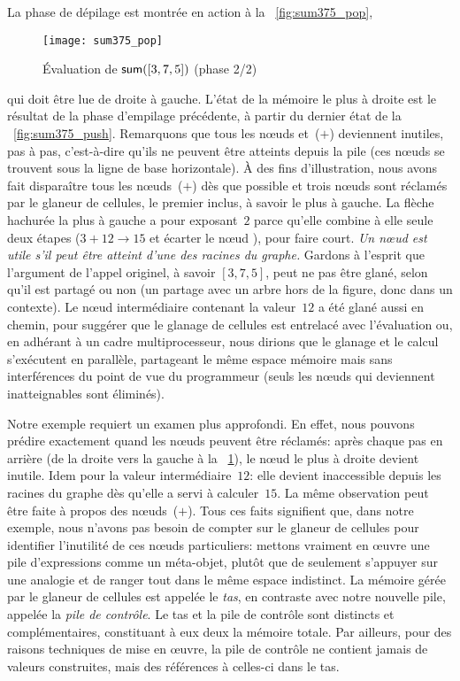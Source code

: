La phase de dépilage est montrée en action à la \fig~\vref{fig:sum375_pop},
\begin{figure}[b]
\centering
\texttt{[image: sum375\_pop]}
\caption{Évaluation de \(\textsf{sum}([3,7,5])\) (phase 2/2)
\label{fig:sum375_pop}}
\end{figure}
qui doit être lue de droite à gauche. L'état de la mémoire le plus à
droite est le résultat de la phase d'empilage précédente, à partir du
dernier état de la \fig~\ref{fig:sum375_push}. Remarquons que tous les
n{\oe}uds  et~(\(+\)) deviennent inutiles, pas à pas,
c'est-à-dire qu'ils ne peuvent être atteints depuis la pile (ces
n{\oe}uds se trouvent sous la ligne de base horizontale). À des fins
d'illustration, nous avons fait disparaître tous les n{\oe}uds~(\(+\))
dès que possible et trois n{\oe}uds  sont réclamés par le
glaneur de cellules, le premier inclus, à savoir le plus à gauche. La
flèche hachurée la plus à gauche a pour exposant~\(2\) parce qu'elle
combine à elle seule deux étapes (\(3+12 \rightarrow 15\) et écarter
le n{\oe}ud ), pour faire court. \emph{Un n{\oe}ud est utile
  s'il peut être atteint d'une des racines du graphe.} Gardons à
l'esprit que l'argument de l'appel originel, à savoir \([3,7,5]\),
peut ne pas être glané, selon qu'il est partagé ou non (un partage
avec un arbre hors de la figure, donc dans un contexte). Le n{\oe}ud
intermédiaire contenant la valeur~\(12\) a été glané aussi en chemin,
pour suggérer que le glanage de cellules est entrelacé avec
l'évaluation ou, en adhérant à un cadre multiprocesseur, nous dirions
que le glanage et le calcul s'exécutent en parallèle, partageant le
même espace mémoire mais sans interférences du point de vue du
programmeur (seuls les n{\oe}uds qui deviennent inatteignables sont
éliminés).

Notre exemple requiert un examen plus approfondi. En effet, nous
pouvons prédire exactement quand les n{\oe}uds  peuvent être
réclamés: après chaque pas en arrière (de la droite vers la gauche à
la \fig~\ref{fig:sum375_pop}), le n{\oe}ud  le plus à droite
devient inutile. Idem pour la valeur intermédiaire~\(12\): elle
devient inaccessible depuis les racines du graphe dès qu'elle a servi
à calculer~\(15\). La même observation peut être faite à propos des
n{\oe}uds~(\(+\)). Tous ces faits signifient que, dans notre exemple,
nous n'avons pas besoin de compter sur le glaneur de cellules pour
identifier l'inutilité de ces n{\oe}uds particuliers: mettons vraiment
en {\oe}uvre une pile d'expressions comme un méta-objet, plutôt que de
seulement s'appuyer sur une analogie et de ranger tout dans le même
espace indistinct. La mémoire gérée par le glaneur de cellules est
appelée le \emph{tas}, en contraste avec notre nouvelle pile, appelée
la \emph{pile de contrôle}. Le tas et la pile de contrôle sont
distincts et complémentaires, constituant à eux deux la mémoire
totale. Par ailleurs, pour des raisons techniques de mise en
{\oe}uvre, la pile de contrôle ne contient jamais de valeurs
construites, mais des références à celles-ci dans le tas.

